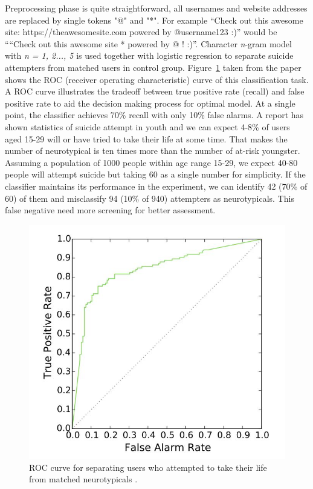 Preprocessing phase is quite straightforward, all usernames and website addresses are replaced by single tokens "@" and "*". For example “Check out this awesome site: https://theawesomesite.com powered by @username123 :)” would be ““Check out this awesome site * powered by @ ! :)”. Character \textit{n}-gram model with \textit{n = 1, 2..., 5} is used together with logistic regression to separate suicide attempters from matched users in control group. Figure~\ref{fig:roc_curve} taken from the paper shows the ROC (receiver operating characteristic) curve of this classification task. A ROC curve illustrates the tradeoff between true positive rate (recall) and false positive rate to aid the decision making process for optimal model. At a single point, the classifier achieves 70\% recall with only 10\% false alarms. A report \cite{Kann2016} has shown statistics of suicide attempt in youth and we can expect 4-8\% of users aged 15-29 will or have tried to take their life at some time. That makes the number of neurotypical is ten times more than the number of at-risk youngster. Assuming a population of 1000 people within age range 15-29, we expect 40-80 people will attempt suicide but taking 60 as a single number for simplicity. If the classifier maintains its performance in the experiment, we can identify 42 (70\% of 60) of them and misclassify 94 (10\% of 940) attempters as neurotypicals. This false negative need more screening for better assessment.\\

\begin{figure}
\centering
\includegraphics[width=\textwidth, clip=true]{img/ROC_curve}
\caption{ROC curve for separating users who attempted to take their life from matched neurotypicals \cite{Coppersmith2016}.} 
\label{fig:roc_curve}
\end{figure}


